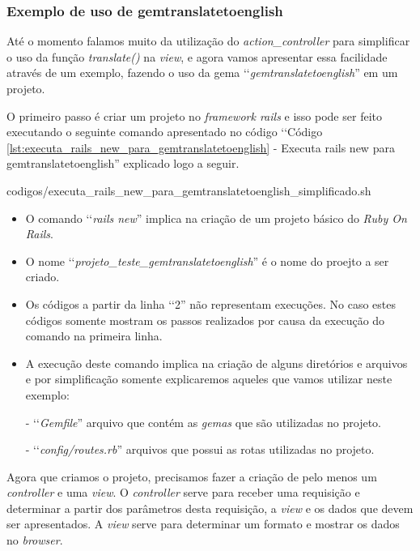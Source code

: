 \subsubsection{Exemplo de uso de gemtranslatetoenglish}
\label{subsubsection:exemplo_de_uso_de_gemtranslatetoenglish}

Até o momento falamos muito da utilização do \emph{action\_controller} para simplificar o uso da função 
\emph{translate()} na \emph{view}, e agora vamos apresentar essa facilidade através de um exemplo, 
fazendo o uso da gema ‘‘\emph{gemtranslatetoenglish}'' em um projeto.

O primeiro passo é criar um projeto no \emph{framework rails} e isso pode ser feito executando 
o seguinte comando apresentado no código ‘‘Código 
\ref{lst:executa_rails_new_para_gemtranslatetoenglish} - Executa rails new para gemtranslatetoenglish''
explicado logo a seguir.


{codigos/executa_rails_new_para_gemtranslatetoenglish_simplificado.sh} 

\begin{itemize}

 \item O comando ‘‘\emph{rails new}'' implica na criação de um projeto básico do \emph{Ruby On Rails}.
 
 \item O nome ‘‘\emph{projeto\_teste\_gemtranslatetoenglish}'' é o nome do proejto a ser criado.
 
  \item Os códigos a partir da linha ‘‘2'' não representam execuções. No caso estes códigos somente 
 mostram os passos realizados por causa da execução do comando na primeira linha.
 
 \item A execução deste comando implica na criação de alguns diretórios e arquivos e por simplificação 
 somente explicaremos aqueles que vamos utilizar neste exemplo:
  
  \subitem - ‘‘\emph{Gemfile}'' arquivo que contém as \emph{gemas} que são utilizadas no projeto.
 
  \subitem - ‘‘\emph{config/routes.rb}'' arquivos que possui as rotas utilizadas no projeto.
 
\end{itemize}

Agora que criamos o projeto, precisamos fazer a criação de pelo menos um \emph{controller} e uma \emph{view}.
O \emph{controller} serve para receber uma requisição e determinar a partir dos parâmetros desta 
requisição, a \emph{view} e os dados que devem ser apresentados. A \emph{view} serve para 
determinar um formato e mostrar os dados no \emph{browser}.

